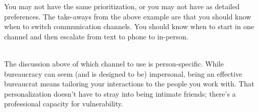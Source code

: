You may not have the same prioritization, or you may not have as detailed preferences. The take-aways from the above example are that you should know when to switch communication channels.
You should know when to start in one channel and then escalate from text to phone to in-person.

\ \\


The discussion above of which channel to use is person-specific. While bureaucracy can seem (and is designed to be) impersonal, being an effective bureaucrat means tailoring your interactions to the people you work with. That personalization doesn't have to stray into being intimate friends; there's a professional capacity for vulnerability. 